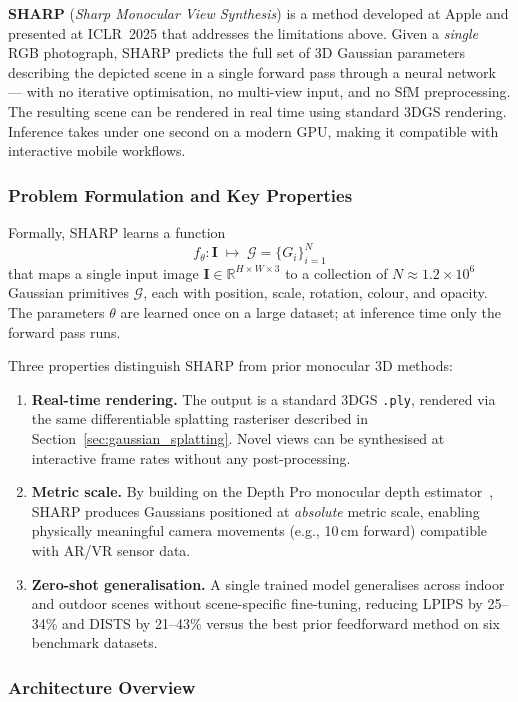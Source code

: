\textbf{SHARP} (\emph{Sharp Monocular View Synthesis}) \cite{mescheder2025sharp} is a method developed at Apple and presented at ICLR~2025 that addresses the limitations above. Given a \emph{single} RGB photograph, SHARP predicts the full set of 3D Gaussian parameters describing the depicted scene in a single forward pass through a neural network — with no iterative optimisation, no multi-view input, and no SfM preprocessing. The resulting scene can be rendered in real time using standard 3DGS rendering. Inference takes under one second on a modern GPU, making it compatible with interactive mobile workflows.

\subsubsection{Problem Formulation and Key Properties}

Formally, SHARP learns a function
\[
    f_\theta : \mathbf{I} \;\longmapsto\; \mathcal{G} = \{G_i\}_{i=1}^{N}
\]
that maps a single input image $\mathbf{I} \in \mathbb{R}^{H \times W \times 3}$ to a collection of $N \approx 1.2 \times 10^6$ Gaussian primitives $\mathcal{G}$, each with position, scale, rotation, colour, and opacity. The parameters $\theta$ are learned once on a large dataset; at inference time only the forward pass runs.

Three properties distinguish SHARP from prior monocular 3D methods:
\begin{enumerate}
    \item \textbf{Real-time rendering.} The output is a standard 3DGS \texttt{.ply}, rendered via the same differentiable splatting rasteriser described in Section~\ref{sec:gaussian_splatting}. Novel views can be synthesised at interactive frame rates without any post-processing.
    \item \textbf{Metric scale.} By building on the Depth Pro monocular depth estimator~\cite{bochkovskii2024depthpro}, SHARP produces Gaussians positioned at \emph{absolute} metric scale, enabling physically meaningful camera movements (e.g., 10\,cm forward) compatible with AR/VR sensor data.
    \item \textbf{Zero-shot generalisation.} A single trained model generalises across indoor and outdoor scenes without scene-specific fine-tuning, reducing LPIPS by 25--34\% and DISTS by 21--43\% versus the best prior feedforward method on six benchmark datasets.
\end{enumerate}

\subsubsection{Architecture Overview}

